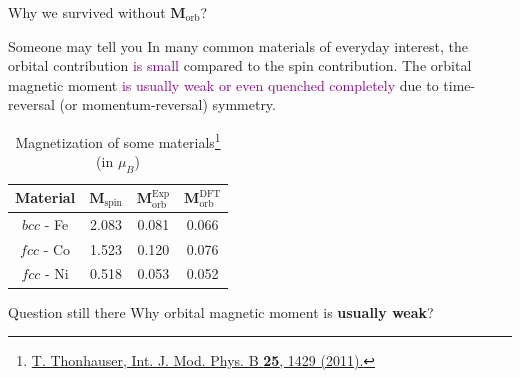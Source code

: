 \documentclass{beamer}
\newcommand{\purple}{\textcolor{purple}}
\begin{document}
    \begin{frame}{Why we survived without \(\bm{M}_{\text{orb}}\)?}\small
      \begin{block}{Someone may tell you}
        In many common materials of everyday interest, the orbital contribution \purple{is small} compared to the spin contribution. The orbital magnetic moment \purple{is usually weak or even quenched completely} due to time-reversal (or momentum-reversal) symmetry.
      \end{block}
      \begin{table}
        \caption{Magnetization of some materials\footnote{\tiny \href{https://doi.org/10.1142/S0217979211058912}{T. Thonhauser, Int. J. Mod. Phys. B \textbf{25}, 1429 (2011).}} (in \(\mu_B\))} 
        \begin{tabular}{c|ccc}
          \toprule
          Material & \(\bm{M}_{\text{spin}}\) & \(\bm{M}_{\text{orb}}^{\text{Exp}}\) & \(\bm{M}_{\text{orb}}^{\text{DFT}}\)\\
          \midrule
          \(bcc\) - Fe & 2.083 & 0.081 & 0.066\\
          \(fcc\) - Co & 1.523 & 0.120 & 0.076\\
          \(fcc\) - Ni & 0.518 & 0.053 & 0.052\\
          \bottomrule
        \end{tabular}
      \end{table}
      \begin{alertblock}{Question still there}
        Why orbital magnetic moment is \textbf{usually weak}?
      \end{alertblock}
    \end{frame}
  
\end{document}
